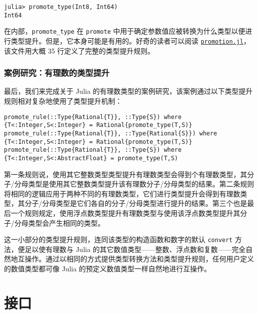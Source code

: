\begin{verbatim}
julia> promote_type(Int8, Int64)
Int64
\end{verbatim}



在内部，\texttt{promote\_type} 在 \texttt{promote} 中用于确定参数值应被转换为什么类型以便进行类型提升。但是，它本身可能是有用的。好奇的读者可以阅读 \href{https://github.com/JuliaLang/julia/blob/master/base/promotion.jl}{\texttt{promotion.jl}}，该文件用大概 35 行定义了完整的类型提升规则。



\hypertarget{8231690970182763012}{}


\subsection{案例研究：有理数的类型提升}



最后，我们来完成关于 Julia 的有理数类型的案例研究，该案例通过以下类型提升规则相对复杂地使用了类型提升机制：




\begin{verbatim}
promote_rule(::Type{Rational{T}}, ::Type{S}) where {T<:Integer,S<:Integer} = Rational{promote_type(T,S)}
promote_rule(::Type{Rational{T}}, ::Type{Rational{S}}) where {T<:Integer,S<:Integer} = Rational{promote_type(T,S)}
promote_rule(::Type{Rational{T}}, ::Type{S}) where {T<:Integer,S<:AbstractFloat} = promote_type(T,S)
\end{verbatim}



第一条规则说，使用其它整数类型类型提升有理数类型会得到个有理数类型，其分子/分母类型是使用其它整数类型提升该有理数分子/分母类型的结果。第二条规则将相同的逻辑应用于两种不同的有理数类型，它们进行类型提升会得到有理数类型，其分子/分母类型是它们各自的分子/分母类型进行提升的结果。第三个也是最后一个规则规定，使用浮点数类型提升有理数类型与使用该浮点数类型提升其分子/分母类型会产生相同的类型。



这一小部分的类型提升规则，连同该类型的构造函数和数字的默认 \texttt{convert} 方法，便足以使有理数与 Julia 的其它数值类型——整数、浮点数和复数——完全自然地互操作。通过以相同的方式提供类型转换方法和类型提升规则，任何用户定义的数值类型都可像 Julia 的预定义数值类型一样自然地进行互操作。



\hypertarget{5506253490972465797}{}


\chapter{接口}




